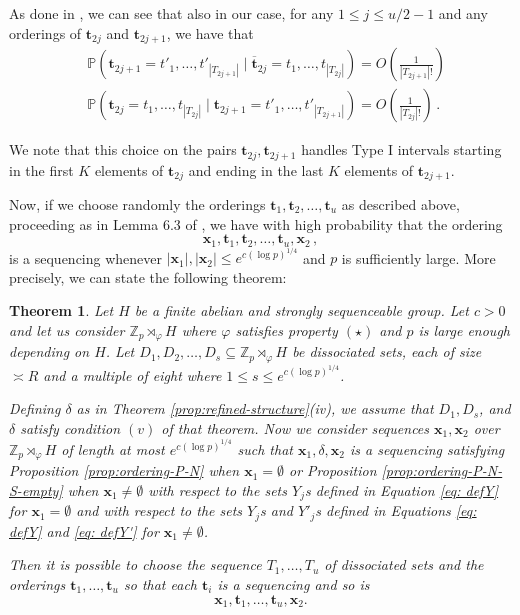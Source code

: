 \documentclass[11pt]{amsart}
\newtheorem{theorem}{Theorem}[section]
\theoremstyle{definition}
\begin{document}
As done in \cite{BK}, we can see that also in our case, for any $1 \leq j \leq u/2-1$ and any orderings of $\mathbf{t}_{2j}$ and $\mathbf{t}_{2j+1}$, we have that
\begin{align}
\nonumber
    &\mathbb{P}\left( \mathbf{t}_{2j+1} = t'_1, \ldots, t'_{|T_{2j+1}|} \mid \overline{\mathbf{t}}_{2j} = t_1, \ldots, t_{|T_{2j}|} \right)  = O\left( \frac{1}{|T_{2j+1}|!} \right)\\
    &\mathbb{P}\left(\mathbf{t}_{2j} = t_1, \ldots, t_{|T_{2j}|} \mid \mathbf{t}_{2j+1} = t'_1, \ldots, t'_{|T_{2j+1}|} \right)  = O\left( \frac{1}{|T_{2j}|!} \right)\,.
\end{align}

We note that this choice on the pairs $\mathbf{t}_{2j}, \mathbf{t}_{2j+1}$ handles Type I intervals starting in the first $K$ elements of $\mathbf{t}_{2j}$ and ending in the last $K$ elements of $\mathbf{t}_{2j+1}$.

Now, if we choose randomly the orderings $\mathbf{t}_1, \mathbf{t}_2, \ldots, \mathbf{t}_u$ as described above, proceeding as in Lemma 6.3 of \cite{BK}, we have with high probability that the ordering
$$
\mathbf{x}_1, \mathbf{t}_1, \mathbf{t}_2, \ldots, \mathbf{t}_u, \mathbf{x}_2\,,
$$
is a sequencing whenever $|\mathbf{x}_1|,|\mathbf{x}_2| \leq e^{c (\log p)^{1/4}}$ and $p$ is sufficiently large. More precisely, we can state the following theorem:

\begin{theorem}\label{lem: adapt-5.5}
Let $H$ be a finite abelian and strongly sequenceable group.
Let $c>0$ and let us consider $\mathbb{Z}_{p} \rtimes_{\varphi} H$ where $\varphi$ satisfies property $(\star)$ and $p$ is large enough depending on $H$.
Let $D_1, D_2, \ldots, D_s \subseteq \mathbb{Z}_{p} \rtimes_{\varphi} H$ be dissociated sets, each of size $\asymp R$ and a multiple of eight where $1 \leq s \leq e^{c (\log p)^{1/4}}$.

Defining $\delta$ as in Theorem \ref{prop:refined-structure}(iv), we assume that $D_1, D_s$, and $\delta$ satisfy condition $(v)$ of that theorem.  Now we consider sequences $\mathbf{x}_1, \mathbf{x}_2$ over $\mathbb{Z}_{p} \rtimes_{\varphi} H$ of length at most $e^{c (\log p)^{1/4}}$ such that $\mathbf{x}_1, \delta, \mathbf{x}_2$ is a sequencing satisfying Proposition \ref{prop:ordering-P-N} when $\mathbf{x}_1 = \emptyset$ or Proposition \ref{prop:ordering-P-N-S-empty} when $\mathbf{x}_1 \neq \emptyset$ with respect to the sets $Y_j$s defined in Equation \eqref{eq: defY} for $\mathbf{x}_1 = \emptyset$ and with respect to the sets $Y_j$s and $Y'_j$s defined in Equations \eqref{eq: defY} and \eqref{eq: defY'} for $\mathbf{x}_1 \neq \emptyset$.

Then it is possible to choose the sequence $T_1, \ldots, T_u$ of dissociated sets and the orderings $\mathbf{t}_1,\dots, \mathbf{t}_u$ so that each $\mathbf{t}_i$ is a sequencing and so is
$$\mathbf{x}_1, \mathbf{t}_1,\ldots, \mathbf{t}_u,\mathbf{x}_2.$$
\end{theorem}
\end{document}
